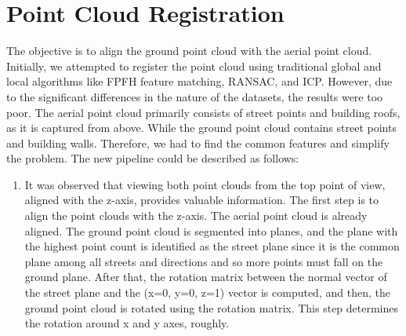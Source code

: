 \documentclass[11pt]{article}
\begin{document}
    \section{Point Cloud Registration}
    The objective is to align the ground point cloud with the aerial point cloud. Initially, we attempted
    to register the point cloud using traditional global and local algorithms like FPFH feature matching,
    RANSAC, and ICP. However, due to the significant differences in the nature of the datasets, the results were
    too poor. The aerial point cloud primarily consists of street points and building roofs, as it is captured
    from above. While the ground point cloud contains street points and building walls. Therefore, we had to
    find the common features and simplify the problem. The new pipeline could be described as follows:
    \begin{enumerate}
        \item It was observed that viewing both point clouds from the top point of view, aligned with the z-axis, provides
        valuable information. The first step is to align the point clouds with the z-axis. The aerial
        point cloud is already aligned. The ground point cloud is segmented into planes, and the plane
        with the highest point count is identified as the street plane since it is the common plane among
        all streets and directions and so more points must fall on the ground plane. After that,
        the rotation matrix between the normal vector of the street plane and the (x=0, y=0, z=1) vector
        is computed, and then, the ground point cloud is rotated using the rotation matrix.
        This step determines the rotation around x and y axes, roughly.


\end{enumerate}
\end{document}
